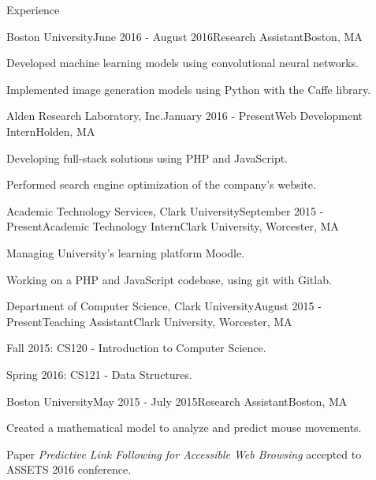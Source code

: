 \documentclass{resume} %
\begin{document}
\begin{rSection}{Experience}


\begin{rSubsection}{Boston University}{June 2016 - August 2016}{Research Assistant}{Boston, MA}
\item Developed machine learning models using convolutional neural networks.
\item Implemented image generation models using Python with the Caffe library.
\end{rSubsection}


\begin{rSubsection}{Alden Research Laboratory, Inc.}{January 2016 - Present}{Web Development Intern}{Holden, MA}
\item Developing full-stack solutions using PHP and JavaScript.
\item Performed search engine optimization of the company's website.
\end{rSubsection}


\begin{rSubsection}{Academic Technology Services, Clark University}{September 2015 - Present}{Academic Technology Intern}{Clark University, Worcester, MA}
\item Managing University's learning platform Moodle.
\item Working on a PHP and JavaScript codebase, using git with Gitlab.
\end{rSubsection}


\begin{rSubsection}{Department of Computer Science, Clark University}{August 2015 - Present}{Teaching Assistant}{Clark University, Worcester, MA}
\item Fall 2015: CS120 - Introduction to Computer Science.
\item Spring 2016: CS121 - Data Structures.
\end{rSubsection}


\begin{rSubsection}{Boston University}{May 2015 - July 2015}{Research Assistant}{Boston, MA}
\item Created a mathematical model to analyze and predict mouse movements.
\item Paper \emph{Predictive Link Following for Accessible Web Browsing} accepted to ASSETS 2016 conference.
\end{rSubsection}


\end{rSection}
\end{document}
